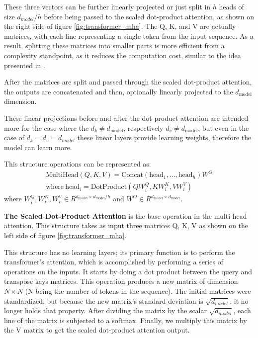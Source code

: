 \documentclass{report}[12pt, a4paper]
\begin{document}

These three vectors can be further linearly projected or just split in $h$ heads of size ${d_{model}}/{h}$ before being passed to the scaled dot-product attention, as shown on the right side of figure \ref{fig:transformer_mha}. The Q, K, and V are actually matrices, with each line representing a single token from the input sequence. As a result, splitting these matrices into smaller parts is more efficient from a complexity standpoint, as it reduces the computation cost, similar to the idea presented in \cite{factorization_tricks_for_lstm_networks}.

After the matrices are split and passed through the scaled dot-product attention, the outputs are concatenated and then, optionally linearly projected to the $d_{\text{model}}$ dimension. 

These linear projections before and after the dot-product attention are intended more for the case where the $d_k \neq d_{\text{model}}$, respectively $d_v \neq d_{\text{model}}$, but even in the case of $d_k = d_v = d_{model}$ these linear layers provide learning weights, therefore the model can learn more.

This structure operations can be represented as:
\begin{align*}
    {\text{MultiHead}}(Q, K, V) = \text{Concat}\left(\text{head}_1, \dots, \text{head}_h\right)W^O\\
    \text{where}\ \text{head}_i = \text{DotProduct}\left(QW_i^Q,KW_i^K,VW_i^V\right)
\end{align*}
where $W_i^Q, W_i^K, W_i^V \in R^{d_{\text{model}}\times d_{\text{model}}/h}$ and $W^O\in R^{d_{\text{model}}\times d_{\text{model}}}$.

\textbf{The Scaled Dot-Product Attention} is the base operation in the multi-head attention. This structure takes as input three matrices Q, K, V as shown on the left side of figure \ref{fig:transformer_mha}. 

This structure has no learning layers; its primary function is to perform the transformer's attention, which is accomplished by performing a series of operations on the inputs. It starts by doing a dot product between the query and transpose keys matrices. This operation produces a new matrix of dimension $N\times N$ (N being the number of tokens in the sequence). The initial matrices were standardized, but because the new matrix's standard deviation is $\sqrt{d_{model}}$, it no longer holds that property. After dividing the matrix by the scalar $\sqrt{d_{model}}$, each line of the matrix is subjected to a softmax. Finally, we multiply this matrix by the V matrix to get the scaled dot-product attention output.
\end{document}
